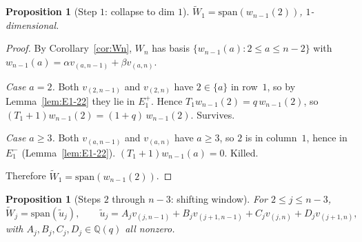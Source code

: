 \documentclass[11pt]{article}
\newtheorem{proposition}[theorem]{Proposition}
\theoremstyle{definition}
\begin{document}
\begin{proposition}[Step $1$: collapse to dim $1$]\label{prop:step1}
$\widetilde{W}_1 = \mathrm{span}(w_{n-1}(2))$, $1$-dimensional.
\end{proposition}

\begin{proof}
By Corollary~\ref{cor:Wn}, $W_n$ has basis $\{w_{n-1}(a) : 2 \le a \le n-2\}$
with $w_{n-1}(a) = \alpha v_{(a,n-1)} + \beta v_{(a,n)}$.

\emph{Case $a = 2$.} Both $v_{(2,n-1)}$ and $v_{(2,n)}$ have
$2 \in \{a\}$ in row~$1$, so by Lemma~\ref{lem:E1-22} they lie in
$E_1^+$.  Hence $T_1 w_{n-1}(2) = q\,w_{n-1}(2)$, so
$(T_1{+}1) w_{n-1}(2) = (1+q)\,w_{n-1}(2)$.  Survives.

\emph{Case $a \ge 3$.} Both $v_{(a,n-1)}$ and $v_{(a,n)}$ have $a \ge 3$,
so $2$ is in column~$1$, hence in $E_1^-$ (Lemma~\ref{lem:E1-22}).
$(T_1{+}1) w_{n-1}(a) = 0$.  Killed.

Therefore $\widetilde{W}_1 = \mathrm{span}(w_{n-1}(2))$.
\end{proof}

\begin{proposition}[Steps $2$ through $n-3$: shifting window]\label{prop:shift}
For $2 \le j \le n - 3$,
\[
   \widetilde{W}_j = \mathrm{span}(\widetilde{u}_j),
   \qquad
   \widetilde{u}_j = A_j v_{(j,n-1)} + B_j v_{(j+1,n-1)}
                    + C_j v_{(j,n)} + D_j v_{(j+1,n)},
\]
with $A_j, B_j, C_j, D_j \in \mathbb{Q}(q)$ all nonzero.
\end{proposition}
\end{document}
